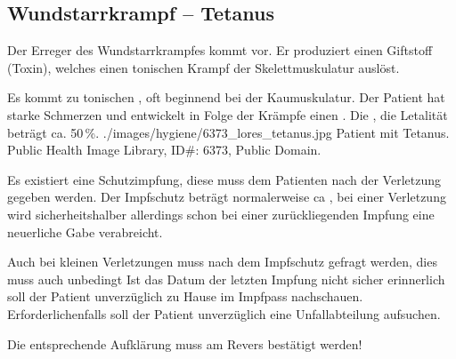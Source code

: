


\subsection{Wundstarrkrampf -- Tetanus}





Der Erreger des Wundstarrkrampfes kommt
 vor. Er produziert einen Giftstoff (Toxin),
welches einen tonischen Krampf der Skelettmuskulatur
auslöst. 


{%
Es kommt zu tonischen , oft beginnend bei der
Kaumuskulatur. Der Patient hat starke Schmerzen und
entwickelt in Folge der Krämpfe einen . Die
, die Letalität beträgt ca.
50\,\%.
}
{
}
{./images/hygiene/6373_lores_tetanus.jpg}
{Patient mit Tetanus.}
{Public Health Image Library, ID\#: 6373, Public Domain.}

{
\label{topic:tetanus-impfschutz}
Es existiert
eine Schutzimpfung, diese muss dem Patienten  nach der
Verletzung gegeben werden. Der Impfschutz beträgt
normalerweise ca , bei einer
Verletzung wird sicherheitshalber allerdings schon bei einer
 zurückliegenden Impfung eine neuerliche Gabe verabreicht.

Auch bei kleinen Verletzungen muss nach dem Impfschutz
gefragt werden, dies muss auch unbedingt  Ist das Datum der letzten Impfung nicht
sicher erinnerlich soll der Patient unverzüglich zu Hause im
Impfpass nachschauen. Erforderlichenfalls soll der Patient
unverzüglich eine Unfallabteilung aufsuchen. 

Die entsprechende Aufklärung muss am Revers bestätigt werden!
}
{
}
{}
{}
{}

